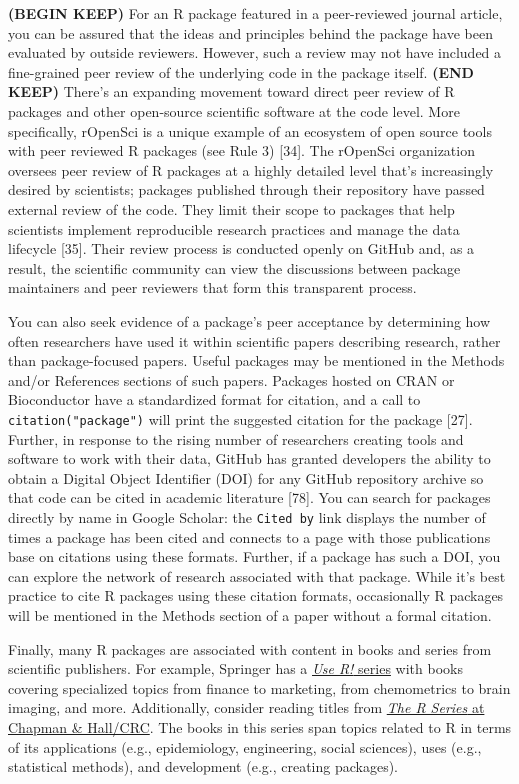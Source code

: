\documentclass[10pt,letterpaper]{article}
\begin{document}
\textbf{(BEGIN KEEP)} For an R package featured in a peer-reviewed
journal article, you can be assured that the ideas and principles behind
the package have been evaluated by outside reviewers. However, such a
review may not have included a fine-grained peer review of the
underlying code in the package itself. \textbf{(END KEEP)} There's an
expanding movement toward direct peer review of R packages and other
open-source scientific software at the code level. More specifically,
rOpenSci is a unique example of an ecosystem of open source tools with
peer reviewed R packages (see Rule 3) {[}34{]}. The rOpenSci
organization oversees peer review of R packages at a highly detailed
level that's increasingly desired by scientists; packages published
through their repository have passed external review of the code. They
limit their scope to packages that help scientists implement
reproducible research practices and manage the data lifecycle {[}35{]}.
Their review process is conducted openly on GitHub and, as a result, the
scientific community can view the discussions between package
maintainers and peer reviewers that form this transparent process.

You can also seek evidence of a package's peer acceptance by determining
how often researchers have used it within scientific papers describing
research, rather than package-focused papers. Useful packages may be
mentioned in the Methods and/or References sections of such papers.
Packages hosted on CRAN or Bioconductor have a standardized format for
citation, and a call to \texttt{citation("package")} will print the
suggested citation for the package {[}27{]}. Further, in response to the
rising number of researchers creating tools and software to work with
their data, GitHub has granted developers the ability to obtain a
Digital Object Identifier (DOI) for any GitHub repository archive so
that code can be cited in academic literature {[}78{]}. You can search
for packages directly by name in Google Scholar: the \texttt{Cited\ by}
link displays the number of times a package has been cited and connects
to a page with those publications base on citations using these formats.
Further, if a package has such a DOI, you can explore the network of
research associated with that package. While it's best practice to cite
R packages using these citation formats, occasionally R packages will be
mentioned in the Methods section of a paper without a formal citation.

Finally, many R packages are associated with content in books and series
from scientific publishers. For example, Springer has a
\href{https://www.springer.com/series/6991}{\emph{Use R!} series} with
books covering specialized topics from finance to marketing, from
chemometrics to brain imaging, and more. Additionally, consider reading
titles from
\href{https://www.routledge.com/Chapman--HallCRC-The-R-Series/book-series/CRCTHERSER}{\emph{The
R Series} at Chapman \& Hall/CRC}. The books in this series span topics
related to R in terms of its applications (e.g., epidemiology,
engineering, social sciences), uses (e.g., statistical methods), and
development (e.g., creating packages).
\end{document}
